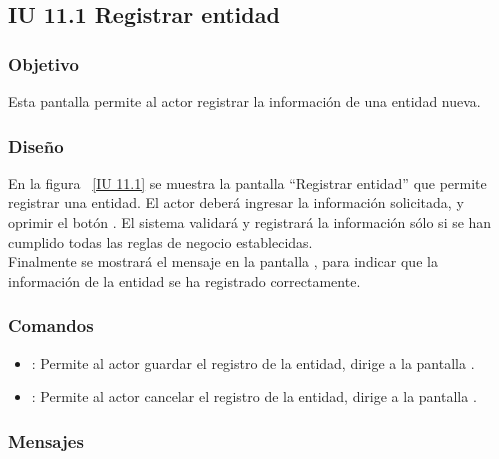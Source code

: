 \newpage 
\subsection{IU 11.1 Registrar entidad}

\subsubsection{Objetivo}
	
	Esta pantalla permite al actor registrar la información de una entidad nueva.

\subsubsection{Diseño}

    En la figura ~\ref{IU 11.1} se muestra la pantalla ``Registrar entidad'' que permite registrar una entidad. El actor deberá ingresar la información solicitada,
    y oprimir el botón . El sistema validará y registrará la información sólo si se han cumplido todas las reglas de negocio establecidas.  \\
    
    Finalmente se mostrará el mensaje  en la pantalla , para indicar que la información de la entidad
    se ha registrado correctamente.        



\subsubsection{Comandos}
\begin{itemize}
	\item {}: Permite al actor guardar el registro de la entidad, dirige a la pantalla .
	\item {}: Permite al actor cancelar el registro de la entidad, dirige a la pantalla .
\end{itemize}

\subsubsection{Mensajes}

